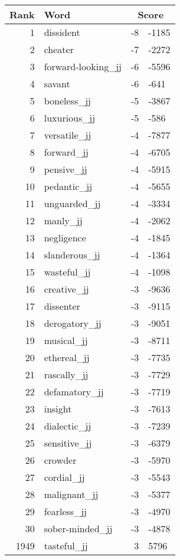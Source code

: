 \begin{longtable}[!htbp]{| rlr@{.}l |}
    \hline
    \textbf{Rank} & \textbf{Word} & \multicolumn{2}{c|}{\textbf{Score}} \\
    \hline
    \endhead
    1 & dissident & -8 & -1185 \\
    2 & cheater & -7 & -2272 \\
    3 & forward-looking\_jj & -6 & -5596 \\
    4 & savant & -6 & -641 \\
    5 & boneless\_jj & -5 & -3867 \\
    6 & luxurious\_jj & -5 & -586 \\
    7 & versatile\_jj & -4 & -7877 \\
    8 & forward\_jj & -4 & -6705 \\
    9 & pensive\_jj & -4 & -5915 \\
    10 & pedantic\_jj & -4 & -5655 \\
    11 & unguarded\_jj & -4 & -3334 \\
    12 & manly\_jj & -4 & -2062 \\
    13 & negligence & -4 & -1845 \\
    14 & slanderous\_jj & -4 & -1364 \\
    15 & wasteful\_jj & -4 & -1098 \\
    16 & creative\_jj & -3 & -9636 \\
    17 & dissenter & -3 & -9115 \\
    18 & derogatory\_jj & -3 & -9051 \\
    19 & musical\_jj & -3 & -8711 \\
    20 & ethereal\_jj & -3 & -7735 \\
    21 & rascally\_jj & -3 & -7729 \\
    22 & defamatory\_jj & -3 & -7719 \\
    23 & insight & -3 & -7613 \\
    24 & dialectic\_jj & -3 & -7239 \\
    25 & sensitive\_jj & -3 & -6379 \\
    26 & crowder & -3 & -5970 \\
    27 & cordial\_jj & -3 & -5543 \\
    28 & malignant\_jj & -3 & -5377 \\
    29 & fearless\_jj & -3 & -4970 \\
    30 & sober-minded\_jj & -3 & -4878 \\
    1949 & tasteful\_jj & 3 & 5796 \\

\end{longtable}
